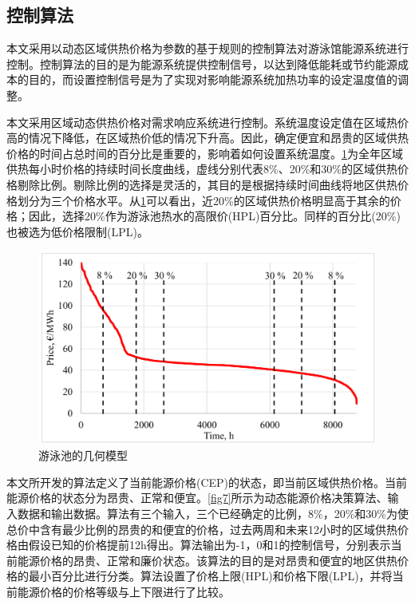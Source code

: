\documentclass[hyperref]{ctexart}
\begin{document}
\begin{multicols}{2}
		\subsection{控制算法}
		本文采用以动态区域供热价格为参数的基于规则的控制算法对游泳馆能源系统进行控制。控制算法的目的是为能源系统提供控制信号，以达到降低能耗或节约能源成本的目的，而设置控制信号是为了实现对影响能源系统加热功率的设定温度值的调整。
		\par
		本文采用区域动态供热价格对需求响应系统进行控制。系统温度设定值在区域热价高的情况下降低，在区域热价低的情况下升高。因此，确定便宜和昂贵的区域供热价格的时间占总时间的百分比是重要的，影响着如何设置系统温度。\cref{fig6}为全年区域供热每小时价格的持续时间长度曲线，虚线分别代表8\%、20\%和30\%的区域供热价格剔除比例。剔除比例的选择是灵活的，其目的是根据持续时间曲线将地区供热价格划分为三个价格水平。从\cref{fig6}可以看出，近20\%的区域供热价格明显高于其余的价格；因此，选择20\%作为游泳池热水的高限价(HPL)百分比。同样的百分比(20\%)也被选为低价格限制(LPL)。
		\par
		\begin{figure}[htbp]
			\centering
			\includegraphics[scale=0.4]{figure_translate/6.png}
			\caption{游泳池的几何模型}
			\label{fig6}
		\end{figure}
		本文所开发的算法定义了当前能源价格(CEP)的状态，即当前区域供热价格。当前能源价格的状态分为昂贵、正常和便宜。\cref{fig7}所示为动态能源价格决策算法、输入数据和输出数据。算法有三个输入，三个已经确定的比例，8\%，20\%和30\%为使总价中含有最少比例的昂贵的和便宜的价格，过去两周和未来12小时的区域供热价格由假设已知的价格提前12h得出。算法输出为-1，0和1的控制信号，分别表示当前能源价格的昂贵、正常和廉价状态。该算法的目的是对昂贵和便宜的地区供热价格的最小百分比进行分类。算法设置了价格上限(HPL)和价格下限(LPL)，并将当前能源价格的价格等级与上下限进行了比较。
		\par

\end{multicols}
\end{document}
